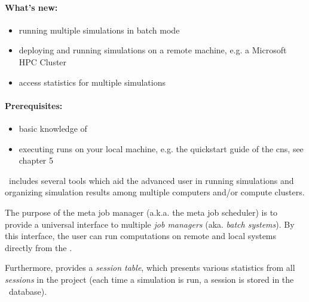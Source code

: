 
\graphicspath{{MetaJobManager/MetaJobManager.texbatch/}}

\paragraph{What's new:} 
\begin{itemize}
	\item running multiple simulations in batch mode
	\item deploying and running simulations on a remote machine, e.g. a Microsoft HPC Cluster
	\item access statistics for multiple simulations
\end{itemize}

\paragraph{Prerequisites:} 
\begin{itemize}
	\item basic knowledge of \BoSSSpad{}
	\item executing runs on your local machine, e.g. the quickstart guide of the \ac{cns}, see chapter 5
\end{itemize}

\BoSSS ~includes several tools which aid the advanced user in running simulations and organizing simulation results among multiple computers and/or compute clusters.


The purpose of the meta job manager (a.k.a. the meta job scheduler)
is to provide a universal interface to multiple \emph{job managers} (aka. \emph{batch systems}).
By this interface, the user can run computations on remote and local systems directly from the \BoSSSpad{}.

Furthermore, \BoSSSpad{}  provides a \emph{session table},
which presents various statistics from all \emph{sessions} in the project
(each time a simulation is run, a session is stored in the \BoSSS ~database).

